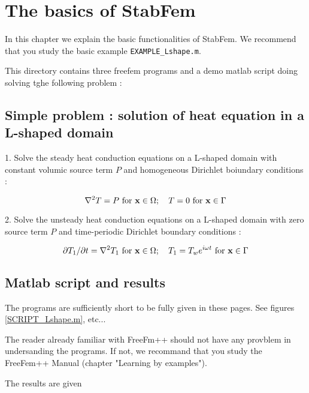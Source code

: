 

\chapter{The basics of StabFem }


In this chapter we explain the basic functionalities of StabFem. We recommend that you study the basic example \texttt{EXAMPLE\_Lshape.m}.

This directory contains three freefem programs and a demo matlab script doing solving tghe following problem :


\section{Simple problem : solution of heat equation in a L-shaped domain}

1. Solve the steady heat conduction equations on a L-shaped domain with constant volumic source term $P$ and homogeneous Dirichlet boiundary conditions :

$$ \nabla^2 T = P  \mbox {  for } {\bf x} \in \Omega ; \quad T = 0   \mbox {  for } {\bf x} \in \Gamma$$

2.  Solve the unsteady heat conduction equations on a L-shaped domain with zero source term $P$ and time-periodic Dirichlet boundary conditions :

$$ 
 \partial T_1/\partial t= \nabla^2 T_1  \mbox {  for } {\bf x} \in \Omega ; \quad T_1 = T_w e^{i \omega t}   \mbox {  for } {\bf x} \in \Gamma
$$



\section{Matlab script and results}

The programs are sufficiently short to be fully given in these pages. See figures \ref{SCRIPT_Lshape.m}, etc...

The reader already familiar with FreeFm++ should not have any provblem in undersanding the programs. If not, we recommand that you study the FreeFem++ Manual (chapter "Learning by examples").

The results are given 


\begin{figure*}[t]
\small

 \normalsize
\caption{
Matlab program {\texttt SCRIPT\_Lshape.m})}
\label{SCRIPT_Lshape.m}
\end{figure*}


